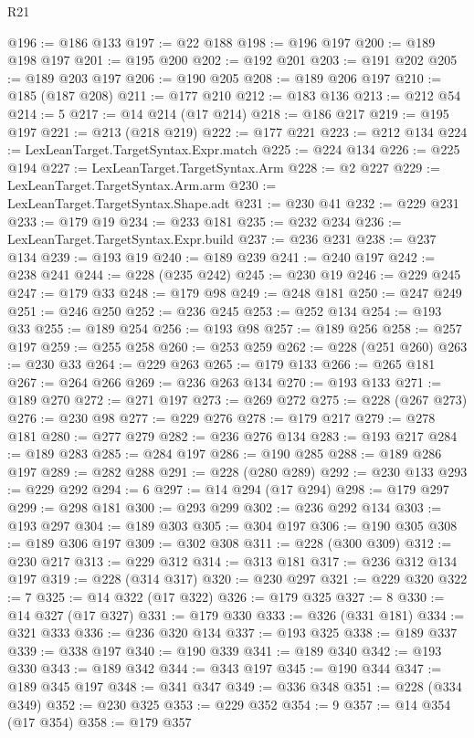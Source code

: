 \begin{lexlean}{R21}
\begin{coremodule}
@196 := @186 @133
@197 := @22 @188
@198 := @196 @197
@200 := @189 @198 @197
@201 := @195 @200
@202 := @192 @201
@203 := @191 @202
@205 := @189 @203 @197
@206 := @190 @205
@208 := @189 @206 @197
@210 := @185 (@187 @208)
@211 := @177 @210
@212 := @183 @136
@213 := @212 @54
@214 := 5
@217 := @14 @214 (@17 @214)
@218 := @186 @217
@219 := @195 @197
@221 := @213 (@218 @219)
@222 := @177 @221
@223 := @212 @134
@224 := LexLeanTarget.TargetSyntax.Expr.match
@225 := @224 @134
@226 := @225 @194
@227 := LexLeanTarget.TargetSyntax.Arm
@228 := @2 @227
@229 := LexLeanTarget.TargetSyntax.Arm.arm
@230 := LexLeanTarget.TargetSyntax.Shape.adt
@231 := @230 @41
@232 := @229 @231
@233 := @179 @19
@234 := @233 @181
@235 := @232 @234
@236 := LexLeanTarget.TargetSyntax.Expr.build
@237 := @236 @231
@238 := @237 @134
@239 := @193 @19
@240 := @189 @239
@241 := @240 @197
@242 := @238 @241
@244 := @228 (@235 @242)
@245 := @230 @19
@246 := @229 @245
@247 := @179 @33
@248 := @179 @98
@249 := @248 @181
@250 := @247 @249
@251 := @246 @250
@252 := @236 @245
@253 := @252 @134
@254 := @193 @33
@255 := @189 @254
@256 := @193 @98
@257 := @189 @256
@258 := @257 @197
@259 := @255 @258
@260 := @253 @259
@262 := @228 (@251 @260)
@263 := @230 @33
@264 := @229 @263
@265 := @179 @133
@266 := @265 @181
@267 := @264 @266
@269 := @236 @263 @134
@270 := @193 @133
@271 := @189 @270
@272 := @271 @197
@273 := @269 @272
@275 := @228 (@267 @273)
@276 := @230 @98
@277 := @229 @276
@278 := @179 @217
@279 := @278 @181
@280 := @277 @279
@282 := @236 @276 @134
@283 := @193 @217
@284 := @189 @283
@285 := @284 @197
@286 := @190 @285
@288 := @189 @286 @197
@289 := @282 @288
@291 := @228 (@280 @289)
@292 := @230 @133
@293 := @229 @292
@294 := 6
@297 := @14 @294 (@17 @294)
@298 := @179 @297
@299 := @298 @181
@300 := @293 @299
@302 := @236 @292 @134
@303 := @193 @297
@304 := @189 @303
@305 := @304 @197
@306 := @190 @305
@308 := @189 @306 @197
@309 := @302 @308
@311 := @228 (@300 @309)
@312 := @230 @217
@313 := @229 @312
@314 := @313 @181
@317 := @236 @312 @134 @197
@319 := @228 (@314 @317)
@320 := @230 @297
@321 := @229 @320
@322 := 7
@325 := @14 @322 (@17 @322)
@326 := @179 @325
@327 := 8
@330 := @14 @327 (@17 @327)
@331 := @179 @330
@333 := @326 (@331 @181)
@334 := @321 @333
@336 := @236 @320 @134
@337 := @193 @325
@338 := @189 @337
@339 := @338 @197
@340 := @190 @339
@341 := @189 @340
@342 := @193 @330
@343 := @189 @342
@344 := @343 @197
@345 := @190 @344
@347 := @189 @345 @197
@348 := @341 @347
@349 := @336 @348
@351 := @228 (@334 @349)
@352 := @230 @325
@353 := @229 @352
@354 := 9
@357 := @14 @354 (@17 @354)
@358 := @179 @357

\end{coremodule}
\end{lexlean}
